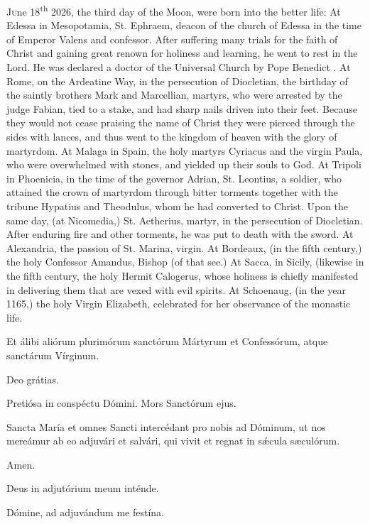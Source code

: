 \begin{enpars}
\lettrine[lraise=0.2]{J}{u}ne 18\textsuperscript{th} 2026, the third day of the Moon, were born into the better life:
At Edessa in Mesopotamia, St. Ephraem, deacon of the church of Edessa in the time of Emperor Valens and confessor. After suffering many trials for the faith of Christ and gaining great renown for holiness and learning, he went to rest in the Lord. He was declared a doctor of the Universal Church by Pope Benedict .
At Rome, on the Ardeatine Way, in the persecution of Diocletian, the birthday of the saintly brothers Mark and Marcellian, martyrs, who were arrested by the judge Fabian, tied to a stake, and had sharp nails driven into their feet. Because they would not cease praising the name of Christ they were pierced through the sides with lances, and thus went to the kingdom of heaven with the glory of martyrdom.
At Malaga in Spain, the holy martyrs Cyriacus and the virgin Paula, who were overwhelmed with stones, and yielded up their souls to God.
At Tripoli in Phoenicia, in the time of the governor Adrian, St. Leontius, a soldier, who attained the crown of martyrdom through bitter torments together with the tribune Hypatius and Theodulus, whom he had converted to Christ.
Upon the same day, (at Nicomedia,) St. Aetherius, martyr, in the persecution of Diocletian. After enduring fire and other torments, he was put to death with the sword.
At Alexandria, the passion of St. Marina, virgin.
At Bordeaux, (in the fifth century,) the holy Confessor Amandus, Bishop (of that see.)
At Sacca, in Sicily, (likewise in the fifth century, the holy Hermit Calogerus, whose holiness is chiefly manifested in delivering them that are vexed with evil spirits.
At Schoenaug, (in the year 1165,) the holy Virgin Elizabeth, celebrated for her observance of the monastic life.
\end{enpars}

\vv Et álibi aliórum plurimórum sanctórum Mártyrum et Confessórum, atque sanctárum Vírginum.

\rr Deo grátias.

\vv Pretiósa in conspéctu Dómini. \rr Mors Sanctórum ejus.

Sancta María et omnes Sancti intercédant pro nobis ad Dóminum, ut nos
mereámur ab eo adjuvári et salvári, qui vivit et regnat in sǽcula sæculórum.

\rr Amen.

\vv Deus in adjutórium meum inténde.

\rr Dómine, ad adjuvándum me festína.

